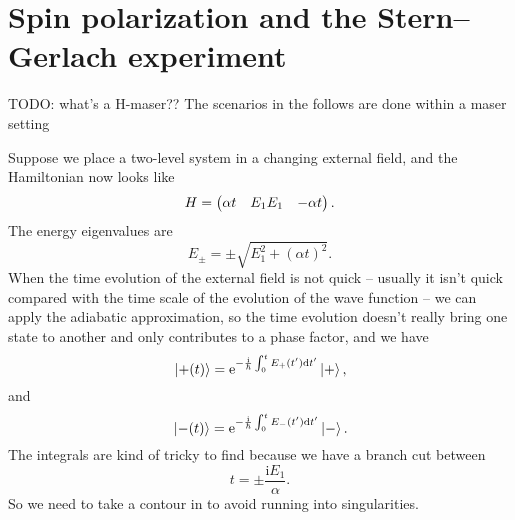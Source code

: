 \documentclass[hyperref, a4paper]{article}
\newcommand*{\ii}{\mathrm{i}}
\newcommand*{\ee}{\mathrm{e}}
\def\\{}%
\begin{document}
\section{Spin polarization and the Stern–Gerlach experiment}

TODO: what's a H-maser?? The scenarios in the follows are done within a maser setting

Suppose we place a two-level system in a changing external field, 
and the Hamiltonian now looks like 
\begin{equation}
    H = \pmqty{
        \alpha t & E_1 \\ E_1 & - \alpha t
    }.
\end{equation}
The energy eigenvalues are 
\begin{equation}
    E_\pm = \pm \sqrt{ E_1^2 + (\alpha t)^2 }.
\end{equation}
When the time evolution of the external field is not quick -- 
usually it isn't quick compared with the time scale of 
the evolution of the wave function -- 
we can apply the adiabatic approximation, 
so the time evolution doesn't really bring 
one state to another 
and only contributes to a phase factor, 
and we have 
\begin{equation}
    \ket*{+ (t)} = \ee^{- \frac{\ii}{\hbar}\int_{0}^{t} E_+ (t') \dd{t'} } \ket*{+}, 
\end{equation}
and 
\begin{equation}
    \ket*{- (t)} = \ee^{- \frac{\ii}{\hbar}\int_{0}^{t} E_- (t') \dd{t'} } \ket*{-}. 
\end{equation}
The integrals are kind of tricky to find 
because we have a branch cut between 
\begin{equation}
    t = \pm \frac{\ii E_1}{\alpha}.
\end{equation}
So we need to take a contour in 
to avoid running into singularities.
\end{document}
